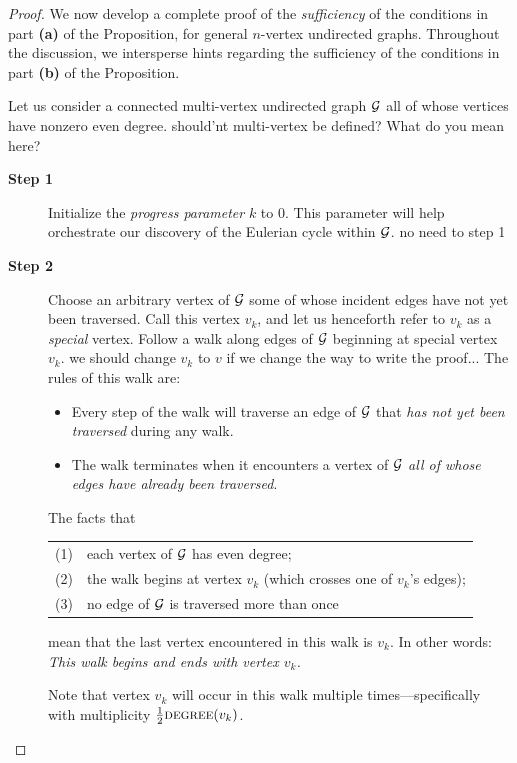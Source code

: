 \begin{proof}
We now develop a complete proof of the {\em sufficiency} of the
conditions in part {\bf (a)} of the Proposition, for general $n$-vertex
undirected graphs.  Throughout the discussion, we intersperse hints
regarding the sufficiency of the conditions in part {\bf (b)} of the
Proposition.

Let us consider a connected multi-vertex undirected graph $\mbox{$\cal G$}$ all of
whose vertices have nonzero even degree.
{\Denis  should'nt multi-vertex be defined? What do you mean here?}

\begin{description}
\item[{\bf Step 1}]
Initialize the {\it progress parameter} $k$ to $0$.  This parameter
will help orchestrate our discovery of the Eulerian cycle within $\mbox{$\cal G$}$.
{\Denis no need to step 1}

\item[{\bf Step 2}]
Choose an arbitrary vertex of $\mbox{$\cal G$}$ some of whose incident edges have not
yet been traversed.  Call this vertex $v_k$, and let us henceforth refer
to $v_k$ as a {\em special} vertex.  Follow a walk along edges of $\mbox{$\cal G$}$
beginning at special vertex $v_k$.  
{\Denis we should change $v_k$ to $v$ if we change the way to write the proof...}
The rules of this walk are:
\begin{itemize}
\item
Every step of the walk will traverse an edge of $\mbox{$\cal G$}$ that {\em has not
  yet been traversed} during any walk.
\item
The walk terminates when it encounters a vertex of $\mbox{$\cal G$}$ {\em all of
  whose edges have already been traversed}.
\end{itemize}
The facts that 

\hspace*{.25in}\begin{tabular}{ll}
(1) & each vertex of $\mbox{$\cal G$}$ has even degree; \\
(2) & the walk begins at vertex $v_k$ (which crosses one of $v_k$'s edges); \\
(3) & no edge of $\mbox{$\cal G$}$ is traversed more than once
\end{tabular}

\noindent
mean that the last vertex encountered in this walk is $v_k$.  In other
words: {\em This walk begins and ends with vertex $v_k$.}

Note that vertex $v_k$ will occur in this walk multiple
times---specifically with multiplicity $\frac{1}{2} \mbox{\sc
  degree}(v_k)$.
  

\end{description}
\end{proof}
